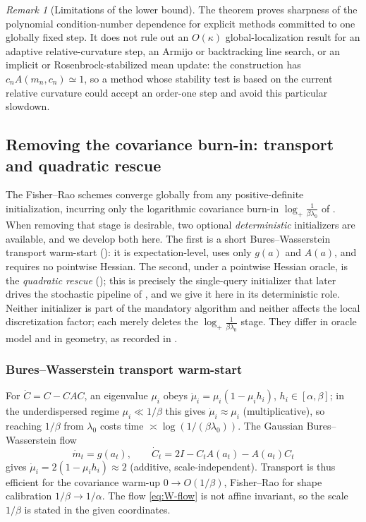 \documentclass[11pt]{article}
\theoremstyle{plain}
\theoremstyle{definition}
\theoremstyle{remark}
\newtheorem{remark}[remark]{Remark}
\newcommand{\Id}{I}
\newcommand{\logp}{\log_+}
\begin{document}
\begin{remark}[Limitations of the lower bound]
The theorem proves sharpness of the polynomial condition-number dependence for explicit methods
committed to one globally fixed step. It does not rule out an $O(\kappa)$ global-localization result for
an adaptive relative-curvature step, an Armijo or backtracking line search, or an implicit or
Rosenbrock-stabilized mean update: the construction has $c_nA(m_n,c_n)\simeq1$, so a method whose
stability test is based on the current relative curvature could accept an order-one step and avoid this
particular slowdown.
\end{remark}

\subsection{Removing the covariance burn-in: transport and quadratic rescue}
\label{sec:transport-bootstrap}

The Fisher--Rao schemes converge globally from any positive-definite initialization, incurring only
the logarithmic covariance burn-in $\logp\tfrac1{\beta\lambda_0}$ of
. When removing that stage is desirable, two
optional \emph{deterministic} initializers are available, and we develop both here. The first is a
short Bures--Wasserstein transport warm-start (): it is
expectation-level, uses only $g(a)$ and $A(a)$, and requires no pointwise Hessian. The second, under
a pointwise Hessian oracle, is the \emph{quadratic rescue} (); this is
precisely the single-query initializer that later drives the stochastic pipeline of
, and we give it here in its deterministic role. Neither initializer is part
of the mandatory algorithm and neither affects the local discretization factor; each merely deletes
the $\logp\tfrac1{\beta\lambda_0}$ stage. They differ in oracle model and in geometry, as recorded in
.

\subsubsection{Bures--Wasserstein transport warm-start}
\label{subsec:transport-warmstart}

For $\dot C=C-CAC$, an eigenvalue $\mu_i$ obeys $\dot\mu_i=\mu_i(1-\mu_ih_i)$, $h_i\in[\alpha,\beta]$;
in the underdispersed regime $\mu_i\ll1/\beta$ this gives $\dot\mu_i\approx\mu_i$ (multiplicative),
so reaching $1/\beta$ from $\lambda_0$ costs time $\asymp\log(1/(\beta\lambda_0))$. The Gaussian
Bures--Wasserstein flow
\begin{equation}
\label{eq:W-flow}
    \dot m_t=g(a_t),\qquad \dot C_t=2\Id-C_tA(a_t)-A(a_t)C_t
\end{equation}
gives $\dot\mu_i=2(1-\mu_ih_i)\approx2$ (additive, scale-independent). Transport is thus efficient
for the covariance warm-up $0\to O(1/\beta)$, Fisher--Rao for shape calibration $1/\beta\to1/\alpha$.
The flow \eqref{eq:W-flow} is not affine invariant, so the scale $1/\beta$ is stated in the given
coordinates.
\end{document}
